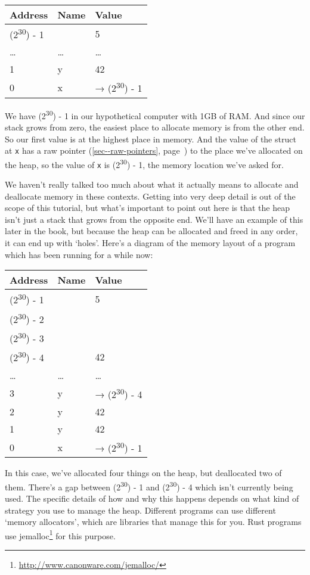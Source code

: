 \documentclass[a4paper,]{book}
\renewcommand*{\hyperref}[2][\ar]{%
  \def\ar{#2}%
  #2 (\autoref{#1}, page~\pageref{#1})}
\renewcommand{\href}[2]{#2\footnote{\url{#1}}}
\begin{document}
\begin{longtable}[c]{@{}lll@{}}
\toprule
Address & Name & Value\tabularnewline
\midrule
\endhead
(2\textsuperscript{30}) - 1 & & 5\tabularnewline
\ldots{} & \ldots{} & \ldots{}\tabularnewline
1 & y & 42\tabularnewline
0 & x & → (2\textsuperscript{30}) - 1\tabularnewline
\bottomrule
\end{longtable}

We have (2\textsuperscript{30}) - 1 in our hypothetical computer with
1GB of RAM. And since our stack grows from zero, the easiest place to
allocate memory is from the other end. So our first value is at the
highest place in memory. And the value of the struct at \texttt{x} has a
\hyperref[sec--raw-pointers]{raw pointer} to the place we've allocated
on the heap, so the value of \texttt{x} is (2\textsuperscript{30}) - 1,
the memory location we've asked for.

We haven't really talked too much about what it actually means to
allocate and deallocate memory in these contexts. Getting into very deep
detail is out of the scope of this tutorial, but what's important to
point out here is that the heap isn't just a stack that grows from the
opposite end. We'll have an example of this later in the book, but
because the heap can be allocated and freed in any order, it can end up
with `holes'. Here's a diagram of the memory layout of a program which
has been running for a while now:

\begin{longtable}[c]{@{}lll@{}}
\toprule
Address & Name & Value\tabularnewline
\midrule
\endhead
(2\textsuperscript{30}) - 1 & & 5\tabularnewline
(2\textsuperscript{30}) - 2 & &\tabularnewline
(2\textsuperscript{30}) - 3 & &\tabularnewline
(2\textsuperscript{30}) - 4 & & 42\tabularnewline
\ldots{} & \ldots{} & \ldots{}\tabularnewline
3 & y & → (2\textsuperscript{30}) - 4\tabularnewline
2 & y & 42\tabularnewline
1 & y & 42\tabularnewline
0 & x & → (2\textsuperscript{30}) - 1\tabularnewline
\bottomrule
\end{longtable}

In this case, we've allocated four things on the heap, but deallocated
two of them. There's a gap between (2\textsuperscript{30}) - 1 and
(2\textsuperscript{30}) - 4 which isn't currently being used. The
specific details of how and why this happens depends on what kind of
strategy you use to manage the heap. Different programs can use
different `memory allocators', which are libraries that manage this for
you. Rust programs use
\href{http://www.canonware.com/jemalloc/}{jemalloc} for this purpose.
\end{document}
